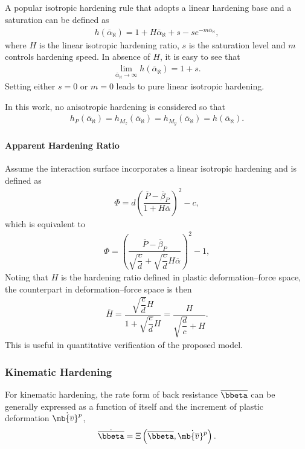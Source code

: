 A popular isotropic hardening rule that adopts a linear hardening base and a saturation \cite{Voce1955} can be defined as
\begin{gather}\label{eq:nm_iso}
h\left(\overline{\alpha}_\aleph\right)=1+H\overline{\alpha}_\aleph+s-se^{-m\overline{\alpha}_\aleph},
\end{gather}
where $H$ is the linear isotropic hardening ratio, $s$ is the saturation level and $m$ controls hardening speed. In absence of $H$, it is easy to see that
\begin{gather}
\lim\limits_{\overline{\alpha}_\aleph\rightarrow\infty}h\left(\overline{\alpha}_\aleph\right)=1+s.
\end{gather}
Setting either $s=0$ or $m=0$ leads to pure linear isotropic hardening.

In this work, no anisotropic hardening is considered so that
\begin{gather}
h_P\left(\overline{\alpha}_\aleph\right)=h_{M_z}\left(\overline{\alpha}_\aleph\right)=h_{M_y}\left(\overline{\alpha}_\aleph\right)=h\left(\overline{\alpha}_\aleph\right).
\end{gather}
\paragraph{Apparent Hardening Ratio}
Assume the interaction surface incorporates a linear isotropic hardening and is defined as
\begin{gather}
\Phi=d\left(\dfrac{\overline{P}-\overline{\beta}_P}{1+H\overline{\alpha}}\right)^2-c,
\end{gather}
which is equivalent to
\begin{gather}
\Phi=\left(\dfrac{\overline{P}-\overline{\beta}_P}{\sqrt{\dfrac{c}{d}}+\sqrt{\dfrac{c}{d}}H\overline{\alpha}}\right)^2-1,
\end{gather}
Noting that $H$ is the hardening ratio defined in plastic deformation--force space, the counterpart in deformation--force space is then \cite{Simo1998}
\begin{gather}\label{eq:nm_eqv_iso_hardening}
\overline{H}=\dfrac{\sqrt{\dfrac{c}{d}}H}{1+\sqrt{\dfrac{c}{d}}H}=\dfrac{H}{\sqrt{\dfrac{d}{c}}+H}.
\end{gather}
This is useful in quantitative verification of the proposed model.
\subsubsection{Kinematic Hardening}
For kinematic hardening, the rate form of back resistance $\overline{\bbeta}$ can be generally expressed as a function of itself and the increment of plastic deformation $\dot{\mb{\overline{v}}^p}$,
\begin{gather}
\dot{\overline{\bbeta}}=\Xi\left(\overline{\bbeta},\dot{\mb{\overline{v}}^p}\right).
\end{gather}


